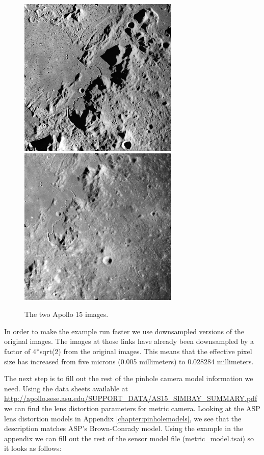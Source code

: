 \begin{figure}[h!]
\centering
  \includegraphics[width=3.0in]{images/examples/pinhole/AS15-M-0414.png}
  \includegraphics[width=3.0in]{images/examples/pinhole/AS15-M-1134.png}
\caption{The two Apollo 15 images.}
\label{fig:pinhole-a15-input-images}
\end{figure}

In order to make the example run faster we use downsampled versions of
the original images.  The images at those links have already been downsampled
by a factor of 4*sqrt(2) from the original images.  This means that the
effective pixel size has increased from five microns (0.005 millimeters) to
0.028284 millimeters.

The next step is to fill out the rest of the pinhole camera model information
we need.  Using the data sheets available at 
\url{http://apollo.sese.asu.edu/SUPPORT_DATA/AS15_SIMBAY_SUMMARY.pdf} 
we can find the lens distortion parameters for metric camera.  Looking at the 
ASP lens distortion models in Appendix \ref{chapter:pinholemodels}, 
we see that the description matches ASP's Brown-Conrady model.  
Using the example in the appendix we can fill out
the rest of the sensor model file (metric\_model.tsai) so it looks as follows:


